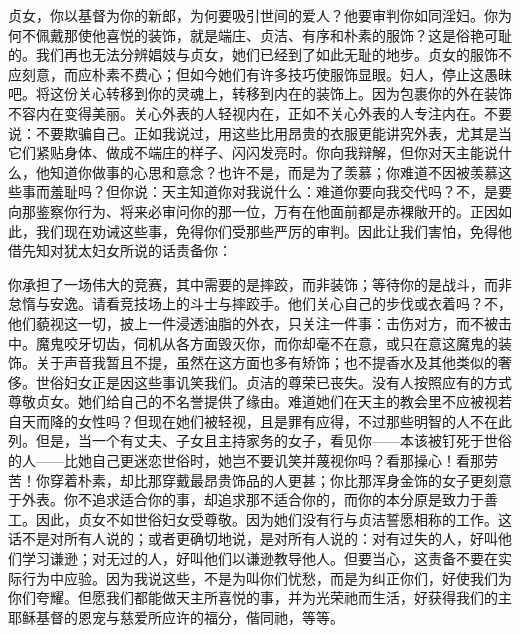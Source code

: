 贞女，你以基督为你的新郎，为何要吸引世间的爱人？他要审判你如同淫妇。你为何不佩戴那使他喜悦的装饰，就是端庄、贞洁、有序和朴素的服饰？这是俗艳可耻的。我们再也无法分辨娼妓与贞女，她们已经到了如此无耻的地步。贞女的服饰不应刻意，而应朴素不费心；但如今她们有许多技巧使服饰显眼。妇人，停止这愚昧吧。将这份关心转移到你的灵魂上，转移到内在的装饰上。因为包裹你的外在装饰不容内在变得美丽。关心外表的人轻视内在，正如不关心外表的人专注内在。不要说：不要欺骗自己。正如我说过，用这些比用昂贵的衣服更能讲究外表，尤其是当它们紧贴身体、做成不端庄的样子、闪闪发亮时。你向我辩解，但你对天主能说什么，他知道你做事的心思和意念？也许不是，而是为了羡慕；你难道不因被羡慕这些事而羞耻吗？但你说：天主知道你对我说什么：难道你要向我交代吗？不，是要向那鉴察你行为、将来必审问你的那一位，万有在他面前都是赤裸敞开的。正因如此，我们现在劝诫这些事，免得你们受那些严厉的审判。因此让我们害怕，免得他借先知对犹太妇女所说的话责备你：\par

你承担了一场伟大的竞赛，其中需要的是摔跤，而非装饰；等待你的是战斗，而非怠惰与安逸。请看竞技场上的斗士与摔跤手。他们关心自己的步伐或衣着吗？不，他们藐视这一切，披上一件浸透油脂的外衣，只关注一件事：击伤对方，而不被击中。魔鬼咬牙切齿，伺机从各方面毁灭你，而你却毫不在意，或只在意这魔鬼的装饰。关于声音我暂且不提，虽然在这方面也多有矫饰；也不提香水及其他类似的奢侈。世俗妇女正是因这些事讥笑我们。贞洁的尊荣已丧失。没有人按照应有的方式尊敬贞女。她们给自己的不名誉提供了缘由。难道她们在天主的教会里不应被视若自天而降的女性吗？但现在她们被轻视，且是罪有应得，不过那些明智的人不在此列。但是，当一个有丈夫、子女且主持家务的女子，看见你——本该被钉死于世俗的人——比她自己更迷恋世俗时，她岂不要讥笑并蔑视你吗？看那操心！看那劳苦！你穿着朴素，却比那穿戴最昂贵饰品的人更甚；你比那浑身金饰的女子更刻意于外表。你不追求适合你的事，却追求那不适合你的，而你的本分原是致力于善工。因此，贞女不如世俗妇女受尊敬。因为她们没有行与贞洁誓愿相称的工作。这话不是对所有人说的；或者更确切地说，是对所有人说的：对有过失的人，好叫他们学习谦逊；对无过的人，好叫他们以谦逊教导他人。但要当心，这责备不要在实际行为中应验。因为我说这些，不是为叫你们忧愁，而是为纠正你们，好使我们为你们夸耀。但愿我们都能做天主所喜悦的事，并为光荣祂而生活，好获得我们的主耶稣基督的恩宠与慈爱所应许的福分，偕同祂，等等。\par


